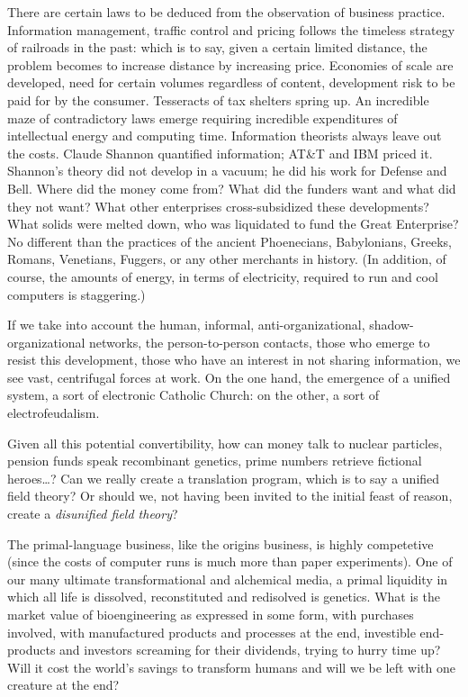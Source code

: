 \documentclass[11pt,twoside,draft]{memoir}
\begin{document}
There are certain laws to be deduced from the observation of business practice. Information
management, traffic control and
pricing follows the timeless strategy of railroads in the past: which is to say, given a
certain limited distance, the problem becomes to increase distance by increasing price.
Economies of scale are developed, need for certain volumes regardless of content, development risk to be paid for by the consumer.
Tesseracts of tax shelters spring up. An incredible maze of contradictory laws emerge
requiring incredible expenditures of intellectual energy and computing time.
Information theorists always leave out the costs.
Claude Shannon quantified information;
AT\&T and IBM priced it. Shannon's theory did not develop in a vacuum; he did his work
for Defense and Bell. Where did the money come from? What did the funders want and
what did they not want? What other enterprises cross-subsidized these developments?
What solids were melted down, who was liquidated to fund the Great Enterprise? No
different than the practices of the ancient Phoenecians, Babylonians, Greeks, Romans,
Venetians, Fuggers, or any other merchants in history. (In addition, of course, the amounts
of energy, in terms of electricity, required to run and cool computers is staggering.)

If we take into account the human, informal, anti-organizational, shadow-organizational networks,
the person-to-person
contacts, those who emerge to resist this development,
those who have an interest in not
sharing information, we see vast, centrifugal
forces at work. On the one hand, the emergence of a unified system, a sort of electronic
Catholic Church: on the other, a sort of
electrofeudalism.

Given all this potential convertibility,
how can money talk to nuclear particles,
pension funds speak recombinant genetics,
prime numbers retrieve fictional heroes\ldots ?
Can we really create a translation program,
which is to say a unified field theory? Or
should we, not having been invited to the
initial feast of reason, create a \emph{disunified field theory}?

The primal-language business, like the
origins business, is highly competetive (since
the costs of computer runs is much more
than paper experiments). One of our many
ultimate transformational and alchemical
media, a primal liquidity in which all life is
dissolved, reconstituted and redisolved is
genetics. What is the market value of bioengineering as expressed in some form, with
purchases involved, with manufactured products and processes at the end, investible
end-products and investors screaming for
their dividends, trying to hurry time up?
Will it cost the world's savings to transform
humans and will we be left with one creature
at the end?
\end{document}
